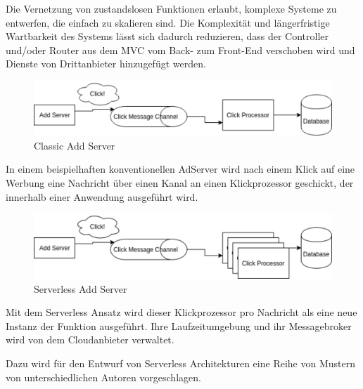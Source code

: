 \documentclass[
12pt,
english,
ngerman,
headsepline,
twoside,
openright,
numbers=noenddot,version=first
]{scrreprt}
\begin{document}
Die Vernetzung von zustandslosen Funktionen erlaubt, komplexe Systeme zu entwerfen, die einfach zu skalieren sind.
Die Komplexität und längerfristige Wartbarkeit des Systems lässt sich dadurch reduzieren, dass der Controller und/oder Router aus dem \acrfull{MVC} \cite{fowlerBlogMVC} vom Back- zum Front-End verschoben wird und Dienste von Drittanbieter hinzugefügt werden. \cite{patternAWS}

\begin{figure}[H]
	\centering
	\includegraphics[scale=0.60]{./pics/classic-example.eps}
	\caption{Classic Add Server}
	\label{pic:classic-add}
\end{figure}
In einem beispielhaften konventionellen AdServer wird nach einem Klick auf eine Werbung eine Nachricht über einen Kanal an einen Klickprozessor geschickt, der innerhalb einer Anwendung ausgeführt wird.
\begin{figure}[H]
	\centering
	\includegraphics[scale=0.60]{./pics/serverless-example.eps}
	\caption{Serverless Add Server}
	\label{pic:serverless-add}
\end{figure}

Mit dem Serverless Ansatz wird dieser Klickprozessor pro Nachricht als eine neue Instanz der Funktion ausgeführt. Ihre Laufzeitumgebung und ihr Messagebroker wird von dem Cloudanbieter verwaltet. \cite{fowlerBlogServerless}
 
Dazu wird für den Entwurf von Serverless Architekturen eine Reihe von Mustern von unterschiedlichen Autoren vorgeschlagen.
\end{document}
